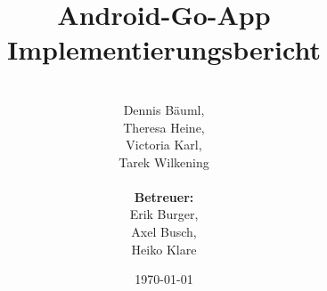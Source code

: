 \documentclass[parskip=full]{scrartcl}
\begin{document}
\title{Android-Go-App Implementierungsbericht}
\author{\\Dennis Bäuml,\\Theresa Heine,\\ Victoria Karl, \\ Tarek Wilkening\\
	\\ \textbf{Betreuer:} \\Erik Burger, \\Axel Busch, \\Heiko Klare \\}

\date{\today}
\maketitle
\newpage
\tableofcontents
\newpage



\newpage

\newpage

\newpage

\newpage

\end{document}
